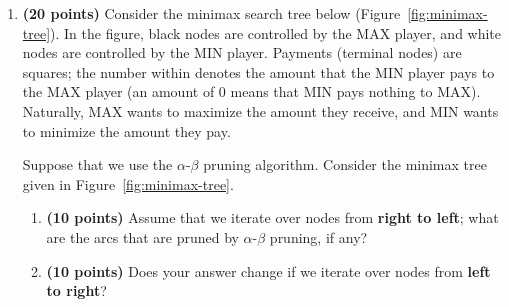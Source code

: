 \documentclass[11pt]{article}
\begin{document}
\begin{enumerate}[label=\textbf{\arabic*.}, leftmargin=*]
Then, pop $G$

Therefore, A* returns
\[
(S,B,G)
\]
But the optimal path is
\[
(S,A,B,G)
\]
Thus, $A^*$ using graph search returns a sub-optimal solution path $(S,B,G)$ from start node $S$ to goal node $G$ with an admissible but inconsistent $h(n)$. 

    \newpage

    \item \textbf{(20 points)} Consider the minimax search tree below (Figure~\ref{fig:minimax-tree}). In the figure, black nodes are controlled by the MAX player, and white nodes are controlled by the MIN player. Payments (terminal nodes) are squares; the number within denotes the amount that the MIN player pays to the MAX player (an amount of $0$ means that MIN pays nothing to MAX). Naturally, MAX wants to maximize the amount they receive, and MIN wants to minimize the amount they pay.

    Suppose that we use the $\alpha$-$\beta$ pruning algorithm. Consider the minimax tree given in Figure~\ref{fig:minimax-tree}.
    \begin{enumerate}[label=(\alph*)]
        \item \textbf{(10 points)} Assume that we iterate over nodes from \textbf{right to left}; what are the arcs that are pruned by $\alpha$-$\beta$ pruning, if any?
        \item \textbf{(10 points)} Does your answer change if we iterate over nodes from \textbf{left to right}?
    \end{enumerate}

    \begin{figure}[h]
        \centering
\end{figure}
\end{enumerate}
\end{document}
